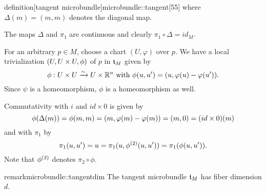 \begin{mystatement}{definition}[tangent microbundle]{microbundle::tangent}[55] where $\Delta(m) = (m, m)$ denotes the diagonal map. \end{mystatement}

\begin{myproof} The maps $\Delta$ and $\pi_1$ are continuous and clearly $\pi_1 \circ \Delta = id_M$.

For an arbitrary $p \in M$, choose a chart $(U, \varphi)$ over $p$. We have a local trivialization $(U, U \times U, \phi)$ of $p$ in $\mathfrak{t}_M$ given by \[ \phi: U \times U \xrightarrow{\sim} U \times \mathbb{R}^n \text{ with } \phi(u, u') = (u, \varphi(u) - \varphi(u')). \] Since $\psi$ is a homeomorphism, $\phi$ is a homeomorphism as well.

Commutativity with $i$ and $id \times 0$ is given by \[ \phi(\Delta(m)) = \phi(m, m) = (m, \varphi(m) - \varphi(m)) = (m, 0) = (id \times 0)(m)\] and with $\pi_1$ by \[ \pi_1(u, u') = u = \pi_1(u, \phi^{(2)}(u, u')) = \pi_1(\phi(u, u')). \] Note that $\phi^{(2)}$ denotes $\pi_2 \circ \phi$. \end{myproof}

\begin{mystatement}{remark}{microbundle::tangentdim} The tangent microbundle $\mathfrak{t}_M$ has fiber dimension $d$. \end{mystatement}
